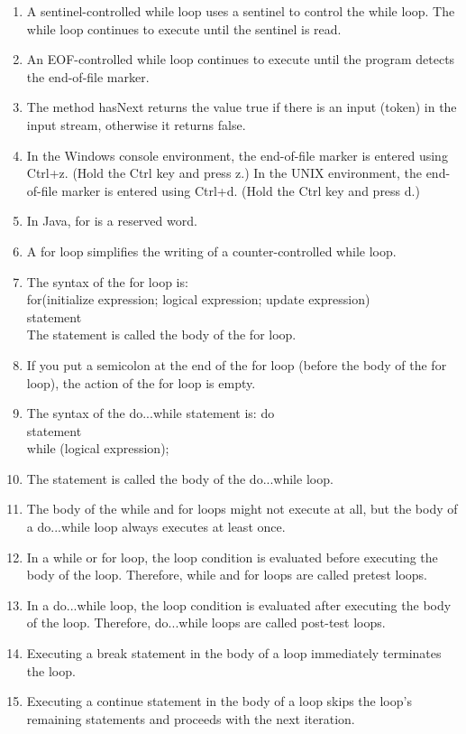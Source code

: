 \documentclass[12pt,a4paper,final,twoside,onecolumn,titlepage]{book}
\begin{document}
\begin{enumerate}
\item A sentinel-controlled while loop uses a sentinel to control the while loop. The while loop continues to execute until the sentinel is read.
\item An EOF-controlled while loop continues to execute until the program detects the end-of-file marker.
\item The method hasNext returns the value true if there is an input (token) in the input stream, otherwise it returns false.
\item In the Windows console environment, the end-of-file marker is entered using Ctrl+z. (Hold the Ctrl key and press z.) In the UNIX environment, the end-of-file marker is entered using Ctrl+d. (Hold the Ctrl key and press d.)
\item In Java, for is a reserved word.
\item A for loop simplifies the writing of a counter-controlled while loop.
\item The syntax of the for loop is: \\
for(initialize expression; logical expression; update expression) \\
statement \\
The statement is called the body of the for loop.
\item If you put a semicolon at the end of the for loop (before the body of the for loop), the action of the for loop is empty.
\item The syntax of the do...while statement is: do\\
statement\\
while (logical expression);
\item The statement is called the body of the do...while loop.
\item The body of the while and for loops might not execute at all, but the body of a do...while loop always executes at least once.
\item In a while or for loop, the loop condition is evaluated before executing the body of the loop. Therefore, while and for loops are called pretest loops.
\item In a do...while loop, the loop condition is evaluated after executing the body of the loop. Therefore, do...while loops are called post-test loops.
\item Executing a break statement in the body of a loop immediately terminates the loop.
\item Executing a continue statement in the body of a loop skips the loop’s remaining statements and proceeds with the next iteration.

\end{enumerate}
\end{document}

